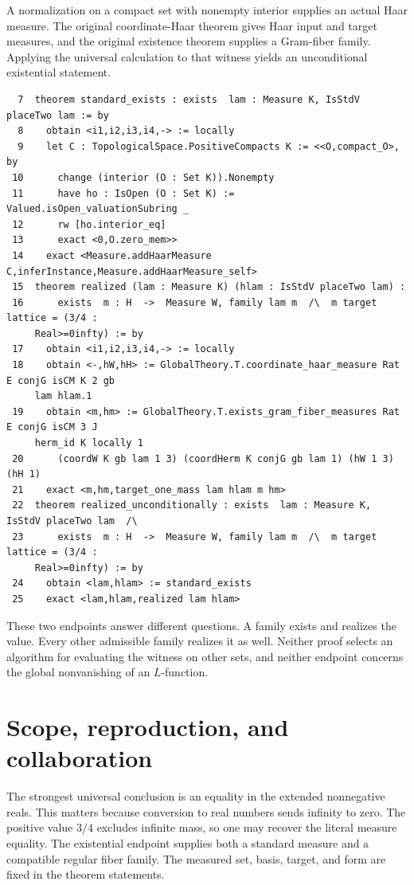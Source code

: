\documentclass[12pt,letterpaper]{article}
\begin{document}
A normalization on a compact set with nonempty interior supplies an actual Haar measure. The original coordinate-Haar theorem gives Haar input and target measures, and the original existence theorem supplies a Gram-fiber family. Applying the universal calculation to that witness yields an unconditional existential statement.
\par
{\fontsize{8.8}{10.5}\selectfont\begin{verbatim}
  7  theorem standard_exists : exists  lam : Measure K, IsStdV placeTwo lam := by
  8    obtain <i1,i2,i3,i4,-> := locally
  9    let C : TopologicalSpace.PositiveCompacts K := <<O,compact_O>, by
 10      change (interior (O : Set K)).Nonempty
 11      have ho : IsOpen (O : Set K) := Valued.isOpen_valuationSubring _
 12      rw [ho.interior_eq]
 13      exact <0,O.zero_mem>>
 14    exact <Measure.addHaarMeasure C,inferInstance,Measure.addHaarMeasure_self>
 15  theorem realized (lam : Measure K) (hlam : IsStdV placeTwo lam) :
 16      exists  m : H  ->  Measure W, family lam m  /\  m target lattice = (3/4 :
     Real>=0infty) := by
 17    obtain <i1,i2,i3,i4,-> := locally
 18    obtain <-,hW,hH> := GlobalTheory.T.coordinate_haar_measure Rat E conjG isCM K 2 gb
     lam hlam.1
 19    obtain <m,hm> := GlobalTheory.T.exists_gram_fiber_measures Rat E conjG isCM 3 J
     herm_id K locally 1
 20      (coordW K gb lam 1 3) (coordHerm K conjG gb lam 1) (hW 1 3) (hH 1)
 21    exact <m,hm,target_one_mass lam hlam m hm>
 22  theorem realized_unconditionally : exists  lam : Measure K, IsStdV placeTwo lam  /\
 23      exists  m : H  ->  Measure W, family lam m  /\  m target lattice = (3/4 :
     Real>=0infty) := by
 24    obtain <lam,hlam> := standard_exists
 25    exact <lam,hlam,realized lam hlam>
\end{verbatim}}
These two endpoints answer different questions. A family exists and realizes the value. Every other admissible family realizes it as well. Neither proof selects an algorithm for evaluating the witness on other sets, and neither endpoint concerns the global nonvanishing of an $L$-function.
\clearpage\section{Scope, reproduction, and collaboration}\label{collab}
The strongest universal conclusion is an equality in the extended nonnegative reals. This matters because conversion to real numbers sends infinity to zero. The positive value $3/4$ excludes infinite mass, so one may recover the literal measure equality. The existential endpoint supplies both a standard measure and a compatible regular fiber family. The measured set, basis, target, and form are fixed in the theorem statements.
\end{document}
